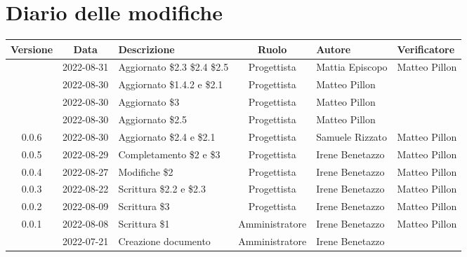 \section*{Diario delle modifiche}
	\begin{center}
	\renewcommand{\arraystretch}{1.8} %
	\begin{longtable}{ |c|c|p{8em}|c|m{5em}|m{6em}| }
	\hline
	\textbf{Versione} & \textbf{Data} & \textbf{Descrizione} &  \textbf{Ruolo} &  \textbf{Autore} & \textbf{Verificatore}\\ %
	\hline %
	& 2022-08-31 & Aggiornato \$2.3 \$2.4 \$2.5 & Progettista & Mattia \newline Episcopo & Matteo \newline Pillon\\ 
	\hline
	& 2022-08-30 & Aggiornato \$1.4.2 e \$2.1 & Progettista & Matteo \newline Pillon & \\ 
	\hline
	& 2022-08-30 & Aggiornato \$3 & Progettista & Matteo \newline Pillon & \\ 
	\hline
	& 2022-08-30 & Aggiornato \$2.5 & Progettista & Matteo \newline Pillon & \\ 
	\hline
	0.0.6& 2022-08-30 & Aggiornato \$2.4 e \$2.1 & Progettista & Samuele \newline Rizzato & Matteo Pillon \\ 
	\hline
	0.0.5& 2022-08-29 & Completamento \$2 e \$3 & Progettista & Irene \newline Benetazzo & Matteo \newline Pillon\\ 
	\hline
	0.0.4& 2022-08-27 & Modifiche \$2 & Progettista & Irene \newline Benetazzo & Matteo \newline Pillon \\ 
	\hline
	0.0.3& 2022-08-22 & Scrittura \$2.2 e \$2.3 & Progettista & Irene \newline Benetazzo & Matteo Pillon\\ 
	\hline
    0.0.2& 2022-08-09 & Scrittura \$3 & Progettista & Irene \newline Benetazzo & Matteo \newline Pillon \\ 
	\hline
	0.0.1& 2022-08-08 & Scrittura \$1 & Amministratore & Irene \newline Benetazzo & Matteo Pillon\\ 
	\hline
	& 2022-07-21 & Creazione documento & Amministratore & Irene \newline Benetazzo & \\ 
	\hline
	\end{longtable}
	\end{center}
	\newpage